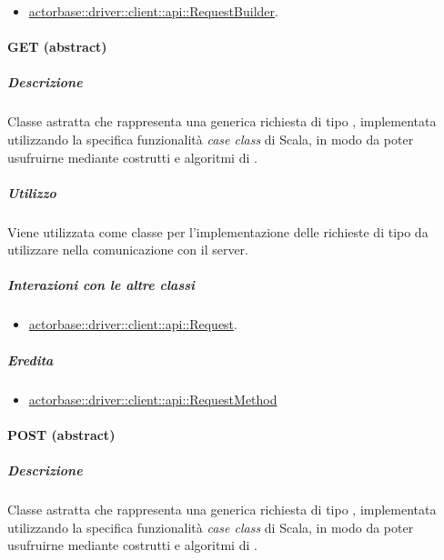 \documentclass{scalatekids-article}
\begin{document}
\begin{itemize}
\item \hyperref[sec:actorbase::driver::client::api::RequestBuilder]{actorbase::driver::client::api::RequestBuilder}.
\end{itemize}


\paragraph{GET (abstract)}
\label{sec:actorbase::driver::client::api::GET}

\subparagraph{Descrizione}

Classe astratta che rappresenta una generica richiesta  di tipo
, implementata utilizzando la specifica funzionalità \textit{case
  class} di Scala, in modo da poter usufruirne mediante costrutti e algoritmi di
.

\subparagraph{Utilizzo}

Viene utilizzata come classe per l'implementazione delle richieste 
di tipo  da utilizzare nella comunicazione con il server.

\subparagraph{Interazioni con le altre classi}

\begin{itemize}
\item \hyperref[sec:actorbase::driver::client::api::Request]{actorbase::driver::client::api::Request}.
\end{itemize}

\subparagraph{Eredita}

\begin{itemize}
\item \hyperref[sec:actorbase::driver::client::api::RequestMethod]{actorbase::driver::client::api::RequestMethod}
\end{itemize}


\paragraph{POST (abstract)}
\label{sec:actorbase::driver::client::api::POST}

\subparagraph{Descrizione}

Classe astratta che rappresenta una generica richiesta  di tipo
, implementata utilizzando la specifica funzionalità \textit{case
  class} di Scala, in modo da poter usufruirne mediante costrutti e algoritmi di
.
\end{document}
